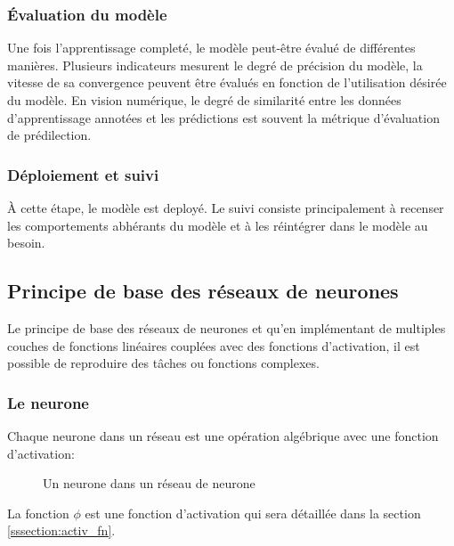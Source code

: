     \subsubsection{Évaluation du modèle}
      Une fois l'apprentissage completé, le modèle peut-être évalué de différentes manières. Plusieurs indicateurs mesurent le degré de précision du modèle, la vitesse de sa convergence peuvent être évalués en fonction de l'utilisation désirée du modèle. En vision numérique, le degré de similarité entre les données d'apprentissage annotées et les prédictions est souvent la métrique d'évaluation de prédilection.
    \subsubsection{Déploiement et suivi}
      À cette étape, le modèle est deployé. Le suivi consiste principalement à recenser les comportements abhérants du modèle et à les réintégrer dans le modèle au besoin. 
  \subsection{Principe de base des réseaux de neurones}
  Le principe de base des réseaux de neurones et qu'en implémentant de multiples couches de fonctions linéaires couplées avec des fonctions d'activation, il est possible de reproduire des tâches ou fonctions complexes. 
    \subsubsection{Le neurone}
      Chaque neurone dans un réseau est une opération algébrique avec une fonction d'activation:

        \begin{figure}[!h]
          \centering
          \caption{Un neurone dans un réseau de neurone}
          \label{fig:neurone}
        \end{figure}
      La fonction $\phi $ est une fonction d'activation qui sera détaillée dans la section \ref{sssection:activ_fn}.
      \FloatBarrier
